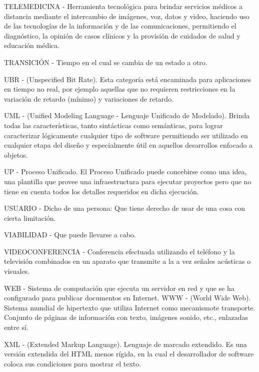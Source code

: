 TELEMEDICINA - Herramienta tecnológica para brindar servicios médicos a distancia mediante el intercambio de imágenes, voz, datos y video, haciendo uso de las tecnologías de la información y de las comunicaciones, permitiendo el diagnóstico, la opinión de casos clínicos y la provisión de cuidados de salud y educación médica.

TRANSICIÓN - Tiempo en el cual se cambia de un estado a otro.

UBR - (Unspecified Bit Rate). Esta categoría está encaminada para aplicaciones en tiempo no real, por ejemplo aquellas que no requieren restricciones en la variación de retardo (mínimo) y variaciones de retardo.

UML - (Unified Modeling Language - Lenguaje Unificado de Modelado). Brinda todas las características, tanto sintácticas como semánticas, para lograr caracterizar lógicamente cualquier tipo de software permitiendo ser utilizado en cualquier etapa del diseño y especialmente útil en aquellos desarrollos enfocado a objetos.

UP - Proceso Unificado. El Proceso Unificado puede concebirse como una idea, una plantilla que provee una infraestructura para ejecutar proyectos pero que no tiene en cuenta todos los detalles requeridos en dicha ejecución.

USUARIO - Dicho de una persona: Que tiene derecho de usar de una cosa con cierta limitación.

VIABILIDAD - Que puede llevarse a cabo.

VIDEOCONFERENCIA - Conferencia efectuada utilizando el teléfono y la televisión combinados en un aparato que transmite a la a vez señales acústicas o visuales.

WEB - Sistema de computación que ejecuta un servidor en red y que se ha configurado para publicar documentos en Internet.
WWW - (World Wide Web). Sistema mundial de hipertexto que utiliza Internet como mecanismote transporte. Conjunto de páginas de información con texto, imágenes sonido, etc., enlazadas entre sí.

XML -  (Extended Markup Language). Lenguaje de marcado extendido. Es una
versión extendida del HTML menos rígida, en la cual el desarrollador de software coloca sus condiciones para mostrar el texto.
